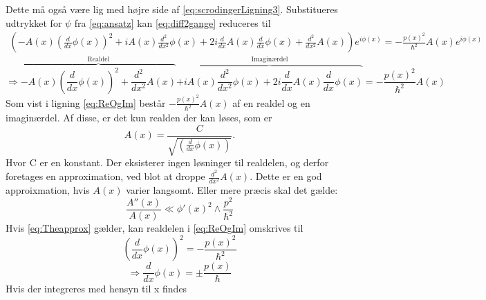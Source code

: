 %
Dette må også være lig med højre side af \cref{eq:scrodingerLigning3}. Substitueres udtrykket for $\psi$ fra \cref{eq:ansatz} kan \cref{eq:diff2gange} reduceres til
%
\begin{align}
    \left(- A{\left (x \right )} \left(\frac{d}{d x} \phi{\left (x \right )}\right)^{2} + i A{\left (x \right )} \frac{d^{2}}{d x^{2}}  \phi{\left (x \right )} + 2 i \frac{d}{d x} A{\left (x \right )} \frac{d}{d x} \phi{\left (x \right )} + \frac{d^{2}}{d x^{2}}  A{\left (x \right )}\right) e^{i \phi{\left (x \right )}} = - \frac{p(x)^2}{\hbar^2} A(x) e^{i \phi(x)}
    \label{eq:udskrevet}
\end{align}
%
\begin{equation}
     \Rightarrow
     \overbrace{- A{\left(x \right)} \left(\frac{d}{d x} \phi{\left(x \right)}\right)^{2}
     + \frac{d^{2}}{d x^{2}}  A{\left (x \right )}}^{\text{Realdel}}
     \overbrace{+ i A{\left(x \right)} \frac{d^{2}}{d x^{2}}  \phi{\left(x \right)}
     + 2 i \frac{d}{d x} A{\left(x \right)} \frac{d}{d x} \phi{\left (x \right )}}^{\text{Imaginærdel}}
     = - \frac{p(x)^2}{\hbar^2} A(x)
     \label{eq:ReOgIm}
\end{equation}
%
Som vist i ligning \cref{eq:ReOgIm} består $- \frac{p(x)^2}{\hbar^2} A(x)$ af en realdel og en imaginærdel. Af disse, er det kun realden der kan løses, som er
%
\begin{equation}
    A(x) = \frac{C}{\sqrt{(\frac{d}{d x} \phi{\left (x \right )})}}.
    \label{eq:ImLoes}
\end{equation}
%
Hvor C er en konstant. Der eksisterer ingen løsninger til realdelen, og derfor foretages en approximation, ved blot at droppe $\frac{d^{2}}{d x^{2}}  A{\left (x \right )}$. Dette er en god approixmation, hvis $A(x)$ varier langsomt. Eller mere præcis skal det gælde:
\begin{equation}
    \frac{A''(x)}{A(x)} \ll \phi'(x)^{2}\wedge \frac{p^{2}}{\hbar^{2}}
    \label{eq:Theapprox}
\end{equation}
%
Hvis \cref{eq:Theapprox} gælder, kan realdelen i \cref{eq:ReOgIm} omskrives til
%
\begin{equation}
    \left(\frac{d}{d x} \phi{\left (x \right )}\right)^{2}
    = - \frac{p(x)^2}{\hbar^2}
    \label{eq:ReApprox}
\end{equation}
%
\begin{equation}
    \Rightarrow \frac{d}{d x} \phi{\left (x \right )}
    = \pm \frac{p(x)}{\hbar}
    \label{eq:ReApproxFinal}
\end{equation}
%
Hvis der integreres med hensyn til x findes
